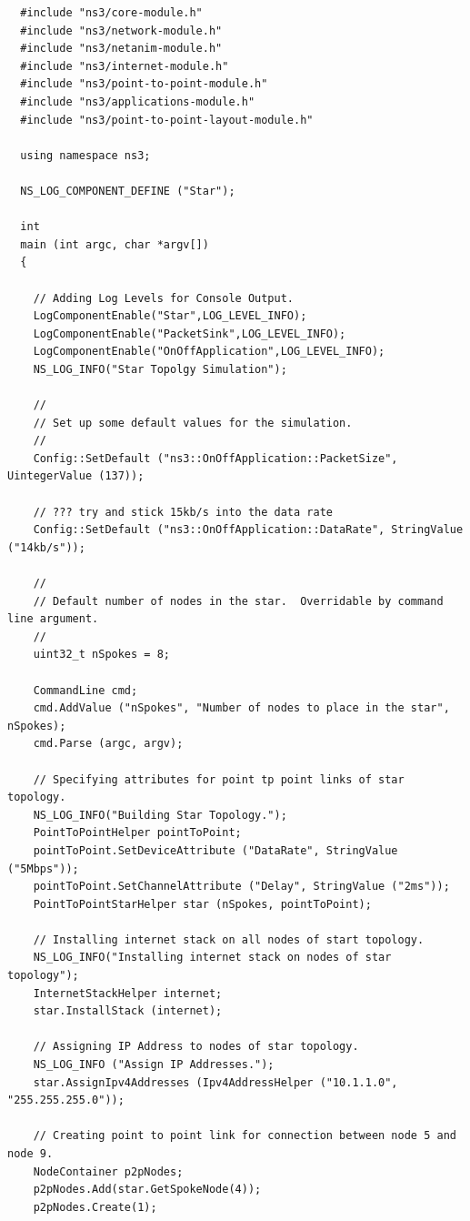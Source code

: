 \documentclass[fullpage]{article}
\begin{document}
\begin{verbatim}
  #include "ns3/core-module.h"
  #include "ns3/network-module.h"
  #include "ns3/netanim-module.h"
  #include "ns3/internet-module.h"
  #include "ns3/point-to-point-module.h"
  #include "ns3/applications-module.h"
  #include "ns3/point-to-point-layout-module.h"

  using namespace ns3;

  NS_LOG_COMPONENT_DEFINE ("Star");

  int
  main (int argc, char *argv[])
  {

    // Adding Log Levels for Console Output.
    LogComponentEnable("Star",LOG_LEVEL_INFO);
    LogComponentEnable("PacketSink",LOG_LEVEL_INFO);
    LogComponentEnable("OnOffApplication",LOG_LEVEL_INFO);
    NS_LOG_INFO("Star Topolgy Simulation");

    //
    // Set up some default values for the simulation.
    //
    Config::SetDefault ("ns3::OnOffApplication::PacketSize", UintegerValue (137));

    // ??? try and stick 15kb/s into the data rate
    Config::SetDefault ("ns3::OnOffApplication::DataRate", StringValue ("14kb/s"));

    //
    // Default number of nodes in the star.  Overridable by command line argument.
    //
    uint32_t nSpokes = 8;

    CommandLine cmd;
    cmd.AddValue ("nSpokes", "Number of nodes to place in the star", nSpokes);
    cmd.Parse (argc, argv);

    // Specifying attributes for point tp point links of star topology.
    NS_LOG_INFO("Building Star Topology.");
    PointToPointHelper pointToPoint;
    pointToPoint.SetDeviceAttribute ("DataRate", StringValue ("5Mbps"));
    pointToPoint.SetChannelAttribute ("Delay", StringValue ("2ms"));
    PointToPointStarHelper star (nSpokes, pointToPoint);

    // Installing internet stack on all nodes of start topology.
    NS_LOG_INFO("Installing internet stack on nodes of star topology");
    InternetStackHelper internet;
    star.InstallStack (internet);

    // Assigning IP Address to nodes of star topology.
    NS_LOG_INFO ("Assign IP Addresses.");
    star.AssignIpv4Addresses (Ipv4AddressHelper ("10.1.1.0", "255.255.255.0"));

    // Creating point to point link for connection between node 5 and node 9.
    NodeContainer p2pNodes;
    p2pNodes.Add(star.GetSpokeNode(4));
    p2pNodes.Create(1);


\end{verbatim}
\end{document}
